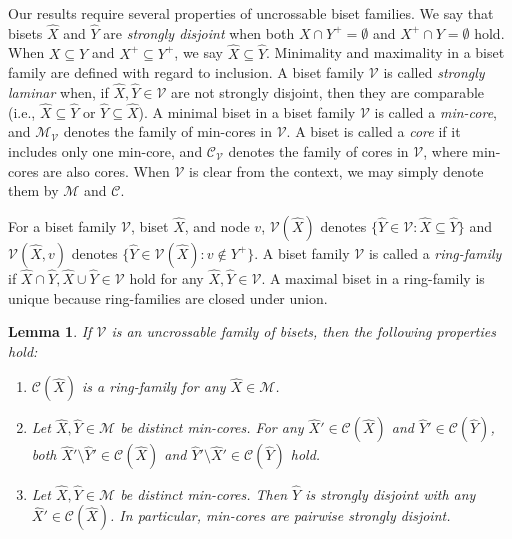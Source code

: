 \documentclass[11pt]{article}
\newtheorem{lemma}{Lemma}
\newcommand{\Mfam}{\mathcal{M}}
\newcommand{\Cfam}{\mathcal{C}}
\newcommand{\Vfam}{\mathcal{V}}
\begin{document}
Our results require several properties of uncrossable biset families.
We say that bisets $\hat{X}$ and $\hat{Y}$ are {\em strongly disjoint}
when both $X\cap Y^+=\emptyset$ and $X^+ \cap Y=\emptyset$ hold.
When $X \subseteq Y$ and $X^+ \subseteq Y^+$,
we say $\hat{X}\subseteq \hat{Y}$.
Minimality and maximality in a biset family are defined with regard to
inclusion.
A biset family $\Vfam$ is called {\em strongly laminar}
when, if $\hat{X},\hat{Y}\in \Vfam$ are not strongly disjoint, then 
they are comparable (i.e.,
$\hat{X}\subseteq \hat{Y}$ or $\hat{Y}\subseteq \hat{X}$).
A minimal biset in a biset family $\Vfam$ is called a {\em min-core}, and
$\Mfam_{\Vfam}$ denotes the family of min-cores in $\Vfam$.
A biset is called a {\em core} if it includes only one min-core, and 
$\Cfam_{\Vfam}$ denotes the family of cores in $\Vfam$,
where min-cores are also cores.
When $\Vfam$ is clear from the context, we may simply denote them
by $\Mfam$ and $\Cfam$.

For a biset family $\Vfam$, biset $\hat{X}$, and node $v$, 
$\Vfam(\hat{X})$ denotes $\{\hat{Y} \in \Vfam \colon
\hat{X}\subseteq \hat{Y}\}$
and $\Vfam(\hat{X},v)$ denotes $\{\hat{Y} \in \Vfam(\hat{X}) \colon
v \not\in Y^+\}$.
A biset family $\Vfam$ is called a {\em ring-family}
if
$\hat{X}\cap \hat{Y}, \hat{X}\cup \hat{Y}\in \Vfam$ hold
for any $\hat{X},\hat{Y} \in \Vfam$.
A maximal biset in a ring-family is unique because ring-families are closed under union.


\begin{lemma}\label{lem.uncrossable}
If $\Vfam$ is an uncrossable family of bisets, then the following properties hold\/{\rm :}
\begin{enumerate}
 \item[\rm (i)] $\Cfam(\hat{X})$ is a ring-family for any 
	      $\hat{X} \in \Mfam$.
 \item[\rm (ii)] Let $\hat{X},\hat{Y} \in \Mfam$ be distinct min-cores.
	      For any $\hat{X}' \in \Cfam(\hat{X})$ and $\hat{Y}' \in
	      \Cfam(\hat{Y})$, 
	      both $\hat{X}'\setminus \hat{Y}'\in \Cfam(\hat{X})$
	      and $\hat{Y}'\setminus \hat{X}'\in \Cfam(\hat{Y})$
	      hold.
 \item[\rm (iii)] Let $\hat{X},\hat{Y} \in \Mfam$ be distinct min-cores.
	      Then $\hat{Y}$ is strongly disjoint with
	      any $\hat{X}' \in \Cfam(\hat{X})$.
	      In particular, min-cores are pairwise strongly disjoint.
\end{enumerate}
\end{lemma}
\end{document}
